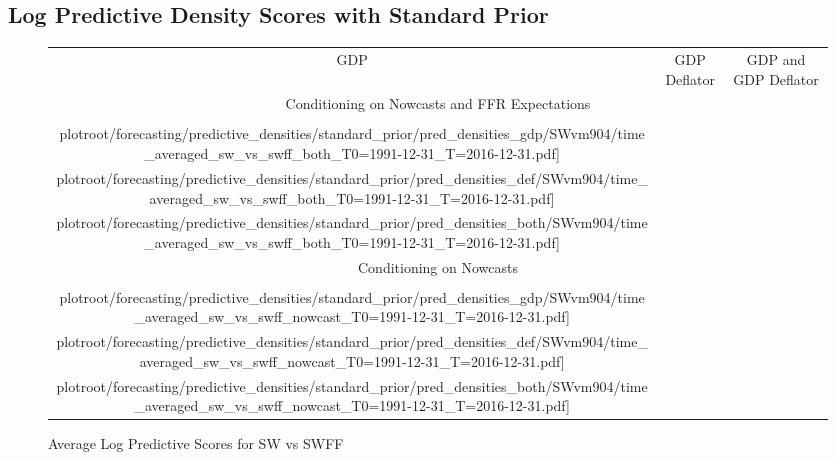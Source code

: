 \documentclass[12pt]{article}
\theoremstyle{definition}
\newcommand\plotroot{../figures_for_paper}
\begin{document}
\subsection{Log Predictive Density Scores with Standard Prior}
\label{subsec:forecasting_standardprior}
\begin{figure}[h!]
    \caption{Average Log Predictive Scores for SW vs SWFF}
    \label{fig:avgpreddens_sw_vs_swff_whole_sample}
      \vspace*{-0.75cm}
  \begin{center}
        \begin{tabular}{@{\hspace*{-.4cm}}ccc}
                    GDP & GDP Deflator & GDP and GDP Deflator \\[-.5ex]
            \multicolumn{3}{c}{Conditioning on Nowcasts and FFR Expectations} \\[-.5ex]
            \texttt{[image: \\plotroot/forecasting/predictive\_densities/standard\_prior/pred\_densities\_gdp/SWvm904/time\_averaged\_sw\_vs\_swff\_both\_T0=1991-12-31\_T=2016-12-31.pdf]} &
            \texttt{[image: \\plotroot/forecasting/predictive\_densities/standard\_prior/pred\_densities\_def/SWvm904/time\_averaged\_sw\_vs\_swff\_both\_T0=1991-12-31\_T=2016-12-31.pdf]} &
            \texttt{[image: \\plotroot/forecasting/predictive\_densities/standard\_prior/pred\_densities\_both/SWvm904/time\_averaged\_sw\_vs\_swff\_both\_T0=1991-12-31\_T=2016-12-31.pdf]} \\[-.5ex]
            \multicolumn{3}{c}{Conditioning on Nowcasts} \\[-.5ex]
            \texttt{[image: \\plotroot/forecasting/predictive\_densities/standard\_prior/pred\_densities\_gdp/SWvm904/time\_averaged\_sw\_vs\_swff\_nowcast\_T0=1991-12-31\_T=2016-12-31.pdf]} &
            \texttt{[image: \\plotroot/forecasting/predictive\_densities/standard\_prior/pred\_densities\_def/SWvm904/time\_averaged\_sw\_vs\_swff\_nowcast\_T0=1991-12-31\_T=2016-12-31.pdf]} &
            \texttt{[image: \\plotroot/forecasting/predictive\_densities/standard\_prior/pred\_densities\_both/SWvm904/time\_averaged\_sw\_vs\_swff\_nowcast\_T0=1991-12-31\_T=2016-12-31.pdf]} \\[-.5ex]

\end{tabular}
\end{center}
\end{figure}
\end{document}
